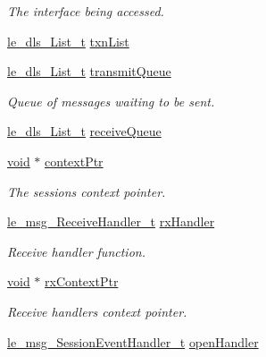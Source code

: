 \begin{DoxyCompactItemize}
\begin{DoxyCompactList}\small\item\em The interface being accessed. \end{DoxyCompactList}\item 
\hyperlink{structle__dls___list__t}{le\+\_\+dls\+\_\+\+List\+\_\+t} \hyperlink{structmsg_session___session__t_a5b9073fec8c9a4121a5e7cd07e31f1a2}{txn\+List}
\item 
\hyperlink{structle__dls___list__t}{le\+\_\+dls\+\_\+\+List\+\_\+t} \hyperlink{structmsg_session___session__t_ae8c1c342359819b5a42be4f397d1dfb1}{transmit\+Queue}
\begin{DoxyCompactList}\small\item\em Queue of messages waiting to be sent. \end{DoxyCompactList}\item 
\hyperlink{structle__dls___list__t}{le\+\_\+dls\+\_\+\+List\+\_\+t} \hyperlink{structmsg_session___session__t_ad927a24e714b551facb14a751fbeaa53}{receive\+Queue}
\item 
\hyperlink{_t_e_m_p_l_a_t_e__cdef_8h_ac9c84fa68bbad002983e35ce3663c686}{void} $\ast$ \hyperlink{structmsg_session___session__t_a91b36af57e35e10d599fa5677a64c265}{context\+Ptr}
\begin{DoxyCompactList}\small\item\em The session\textquotesingle{}s context pointer. \end{DoxyCompactList}\item 
\hyperlink{le__messaging_8h_a9aa36465329fb00e85fb3cbdf034298a}{le\+\_\+msg\+\_\+\+Receive\+Handler\+\_\+t} \hyperlink{structmsg_session___session__t_a0286775af0fae0d876383823217a436f}{rx\+Handler}
\begin{DoxyCompactList}\small\item\em Receive handler function. \end{DoxyCompactList}\item 
\hyperlink{_t_e_m_p_l_a_t_e__cdef_8h_ac9c84fa68bbad002983e35ce3663c686}{void} $\ast$ \hyperlink{structmsg_session___session__t_a3d3d31a3da2a5ac82c3daac3b75d1541}{rx\+Context\+Ptr}
\begin{DoxyCompactList}\small\item\em Receive handler\textquotesingle{}s context pointer. \end{DoxyCompactList}\item 
\hyperlink{le__messaging_8h_a2db32a8ef90eced02789aee366c9dda2}{le\+\_\+msg\+\_\+\+Session\+Event\+Handler\+\_\+t} \hyperlink{structmsg_session___session__t_a8b1f47ca86c7de5ab2ef6cf5fee3622c}{open\+Handler}

\end{DoxyCompactItemize}
